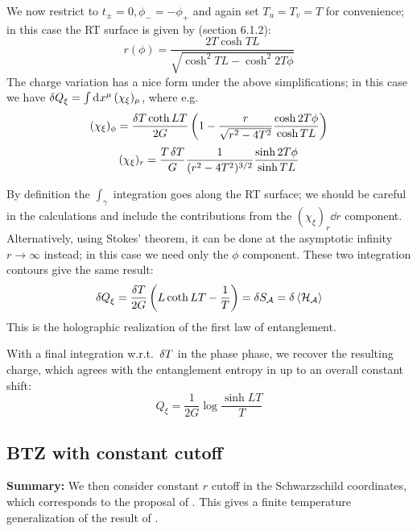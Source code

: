 \documentclass[11pt,a4paper,utf8]{article}
\begin{document}
	We now restrict to $t_\pm = 0, \phi_- = -\phi_+$ and again set $T_u = T_v = T$ for convenience; in this case the RT surface is given by \textcite{Rangamani:2016dms} (section 6.1.2):
	\begin{equation}
		r(\phi) = \frac{2T\cosh TL}{
				\sqrt{\cosh^2 TL - \cosh^2 2T\phi}
			}
	\end{equation}
	The charge variation has a nice form under the above simplifications; in this case we have $
		\mathinner{\delta Q}_{\xi}
		= \int \mathinner{\mathrm{d}^{}x^\mu} (\chi_\xi)_\mu
	$, where e.g.
	\begin{equation}
		(\chi_\xi)_\phi
		= \frac{\mathinner{\delta T} \coth LT}{2G}
			\left(
				1 - {\frac{r}{\sqrt{r^2 - 4T^2}}}
				\frac{\cosh 2T\phi}{\cosh TL}
			\right)
	\end{equation}
	\begin{equation}
		(\chi_\xi)_r
		= \frac{T\mathinner{\delta T}}{G}
			\frac{1}{(r^2 - 4T^2)^{3/2}}
			\frac{\sinh 2T\phi}{\sinh TL}
	\end{equation}
	
	By definition the $\int_\gamma$ integration goes along the RT surface; we should be careful in the calculations and include the contributions from the $(\chi_\xi)_r \dd{r}$ component. 
	Alternatively, using Stokes' theorem, it can be done at the asymptotic infinity $r\to\infty$ instead; in this case we need only the $\phi$ component. These two integration contours give the same result:
	\begin{equation}
		\mathinner{\delta Q}_\xi
		= \frac{\mathinner{\delta T}}{2G} \left(
				L \coth LT - \frac{1}{T}
			\right)
		= \mathinner{\delta S_{\mathcal{A}}}
		= \mathinner{\delta \left\langle\mathcal{H}_{\mathcal{A}}\right\rangle}
	\end{equation}
	This is the holographic realization of the first law of entanglement. 
	
	
	With a final integration w.r.t.~$\mathinner{\delta T}$ in the phase phase, we recover the resulting charge, which agrees with the entanglement entropy in \cite{Rangamani:2016dms} up to an overall constant shift:
	\begin{equation}
		Q_\xi = \frac{1}{2G} \log \frac{\sinh LT}{T}
	\end{equation}
	
\pagebreak
\subsection{BTZ with constant cutoff}
\textbf{Summary:} We then consider constant $r$ cutoff in the Schwarzschild coordinates, which corresponds to the proposal of \cite{McGough:2016lol}. This gives a finite temperature generalization of the result of \cite{Lewkowycz:2019xse}. 
\end{document}
